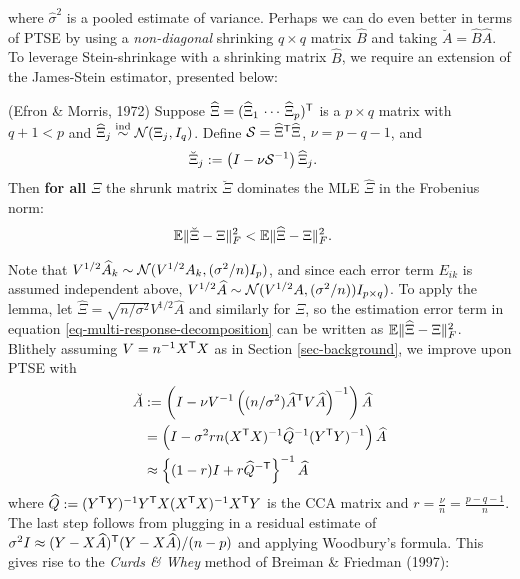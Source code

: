 \documentclass[main]{subfiles}
\begin{document}
\noindent where $\widehat\sigma^2$ is a pooled estimate of variance. Perhaps we can do even better in terms of PTSE by using a {\sl non-diagonal} shrinking $q\times q$ matrix $\widehat{B}$ and taking $\breve{A} = \widehat{B}\widehat{A}$. To leverage Stein-shrinkage with a shrinking matrix $\widehat{B}$, we require an extension of the James-Stein estimator, presented below:

\begin{lemma} (Efron \& Morris, 1972) Suppose $\widehat\Xi = (\widehat\Xi_1 \,\cdots\, \widehat\Xi_p)^\mathsf T$ is a $p\times q$ matrix with $q + 1< p$ and $\widehat\Xi_j\stackrel{\text{ind}}{\sim} \mathcal{N}(\Xi_j, I_q)$. Define $\mathcal{S} = \widehat\Xi^\mathsf T \widehat\Xi$, $\nu = p - q - 1$, and
\begin{align}
\breve\Xi_j
&:= \left(I - \nu \mathcal{S}^{-1}\right)\widehat\Xi_j.
\end{align}
Then {\bf for all} $\Xi$ the shrunk matrix $\breve\Xi$ dominates the MLE $\widehat\Xi$ in the Frobenius norm:
\begin{align}
\mathbb{E}\|\breve\Xi - \Xi\|_F^2
&< \mathbb{E}\|\widehat\Xi - \Xi\|_F^2.
\end{align}
\end{lemma}
Note that $V^{1/2}\widehat{A}_k\sim \mathcal{N}(V^{1/2}A_k, (\sigma^2/n)I_p)$, and since each error term $E_{ik}$ is assumed independent above, $V^{1/2}\widehat{A}\sim \mathcal{N}(V^{1/2}A, (\sigma^2/n))I_{p\times q})$. To apply the lemma, let $\widehat\Xi = \sqrt{n/\sigma^2}V^{1/2}\widehat{A}$ and similarly for $\Xi$, so the estimation error term in equation \eqref{eq-multi-response-decomposition} can be written as $\mathbb{E}\|\widehat\Xi - \Xi\|_F^2$. Blithely assuming $V = n^{-1}X^\mathsf T X$ as in Section \ref{sec-background}, we improve upon PTSE with
\begin{align}
\breve{A}
&:= \left(I - \nu V^{-1} \left((n/\sigma^2)\widehat{A}^\mathsf T V\widehat{A}\right)^{-1}\right)\widehat{A} \\
&=\left(I - \sigma^2rn (X^\mathsf T X)^{-1}\widehat{Q}^{-1}(Y^\mathsf T Y)^{-1}\right)\widehat{A} \\
&\approx \left\{(1-r) I + r\widehat{Q}^{-\mathsf T}\right\}^{-1}\widehat{A}
\end{align}
where $\widehat{Q} := (Y^\mathsf T Y)^{-1}Y^\mathsf T X (X^\mathsf T X)^{-1}  X^\mathsf T Y$ is the CCA matrix and $r = \frac{\nu}{n}= \frac{p-q-1}{n}$. The last step follows from plugging in a residual estimate of $\sigma^2I \approx (Y - X\widehat{A})^\mathsf T (Y - X\widehat{A}) / (n-p)$ and applying Woodbury's formula. This gives rise to the {\sl Curds \& Whey} method of Breiman \& Friedman (1997): \newpage
\end{document}
